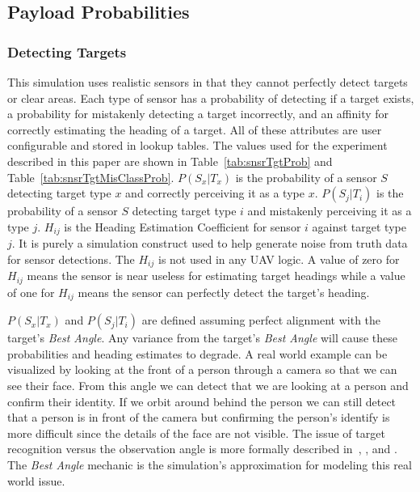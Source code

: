 \subsection{Payload Probabilities}
\label{sec:payload_probs}

\subsubsection{Detecting Targets}
\label{sec:sensor_var_descriptions}
This simulation uses realistic sensors in that they cannot perfectly detect targets or clear areas.  Each type of sensor has a probability of detecting if a target exists, a probability for mistakenly detecting a target incorrectly, and an affinity for correctly estimating the heading of a target.  All of these attributes are user configurable and stored in lookup tables.  The values used for the experiment described in this paper are shown in Table~\ref{tab:snsrTgtProb} and Table~\ref{tab:snsrTgtMisClassProb}.  $P(S_{x}|T_{x})$ is the probability of a sensor $S$ detecting target type $x$ and correctly perceiving it as a type $x$.  $P(S_{j}|T_{i})$ is the probability of a sensor $S$ detecting target type $i$ and mistakenly perceiving it as a type $j$.  $H_{ij}$ is the Heading Estimation Coefficient for sensor $i$ against target type $j$.  It is purely a simulation construct used to help generate noise from truth data for sensor detections.  The $H_{ij}$ is not used in any UAV logic.  A value of zero for $H_{ij}$ means the sensor is near useless for estimating target headings while a value of one for $H_{ij}$ means the sensor can perfectly detect the target's heading.

$P(S_{x}|T_{x})$ and $P(S_{j}|T_{i})$ are defined assuming perfect alignment with the target's \textit{Best Angle}.  Any variance from the target's \textit{Best Angle} will cause these probabilities and heading estimates to degrade.  A real world example can be visualized by looking at the front of a person through a camera so that we can see their face.  From this angle we can detect that we are looking at a person and confirm their identity.  If we orbit around behind the person we can still detect that a person is in front of the camera but confirming the person's identify is more difficult since the details of the face are not visible.  The issue of target recognition versus the observation angle is more formally  described in~\textcite{min_risk_angle}, \textcite{min_angle_res_vs_regard}, and \textcite{accuracy_2d_geometry}.  The \textit{Best Angle} mechanic is the simulation's approximation for modeling this real world issue.

